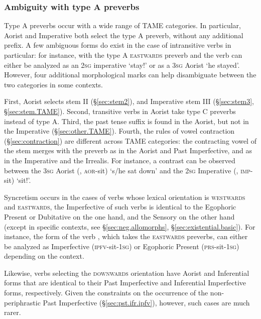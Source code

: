 \subsubsection{Ambiguity with type A preverbs} \label{sec:ambiguity.preverb}
Type A preverbs occur with a wide range of TAME categories. In particular, Aorist and Imperative both select the type A preverb, without any additional prefix. A few ambiguous forms do exist in the case of intransitive verbs in particular: for instance,  with the type A \textsc{eastwards} preverb  and the verb  can either be analyzed as an \textsc{2sg} imperative `stay!' or as a \textsc{3sg} Aorist `he stayed'. However, four additional morphological marks can help disambiguate between the two categories in some contexts. 

First, Aorist selects stem II (§\ref{sec:stem2}), and Imperative stem III (§\ref{sec:stem3}, §\ref{sec:stem.TAME}). Second,  transitive verbs in Aorist take type C preverbs instead of type A. Third, the  past tense suffix is found in the Aorist, but not in the Imperative (§\ref{sec:other.TAME}). Fourth, the rules of vowel contraction (§\ref{sec:contraction}) are different across TAME categories: the contracting vowel of the stem merges with the preverb as  in the Aorist and Past Imperfective, and as  in the Imperative and the Irrealis. For instance, a contrast can be observed between the \textsc{3sg} Aorist  (, \textsc{aor}-sit) `s/he sat down' and the \textsc{2sg} Imperative   (, \textsc{imp}-sit) `sit!'.

Syncretism occurs in the cases of verbs whose lexical orientation is  \textsc{westwards} and \textsc{eastwards}, the Imperfective of such verbs is identical to the Egophoric Present or Dubitative on the one hand, and the Sensory on the other hand (except in specific contexts, see §\ref{sec:neg.allomorphs}, §\ref{sec:existential.basic}). For instance, the form  of the verb , which takes the \textsc{eastwards} preverbs, can either be analyzed as Imperfective (\textsc{ipfv}-sit-\textsc{1sg}) or Egophoric Present (\textsc{prs}-sit-\textsc{1sg}) depending on the context.

Likewise, verbs selecting the \textsc{downwards} orientation have Aorist and Inferential forms that are identical to their Past Imperfective and Inferential Imperfective forms, respectively. Given the constraints on the occurrence of the non-periphrastic  Past Imperfective (§\ref{sec:pst.ifr.ipfv}), however, such cases are much rarer.

